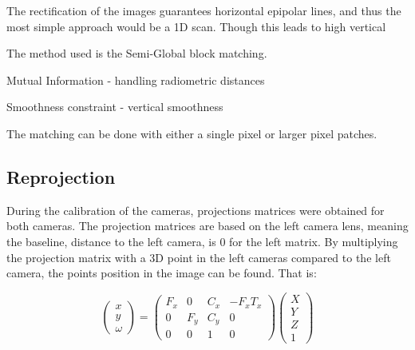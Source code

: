 The rectification of the images guarantees horizontal epipolar lines, and thus the most simple approach would be a 1D scan. Though this leads to high vertical 

The method used is the Semi-Global block matching.




Mutual Information - handling radiometric distances

Smoothness constraint - vertical smoothness





The matching can be done with either a single pixel or larger pixel patches.


\subsection{Reprojection} \label{sec:reprojection}

During the calibration of the cameras, projections matrices were obtained for both cameras. The projection matrices are based on the left camera lens, meaning the baseline, distance to the left camera, is 0 for the left matrix. By multiplying the projection matrix with a 3D point in the left cameras  compared to the left camera, the points position in the image can be found. That is:

\[ 
\begin{pmatrix}
  x \\
  y \\
  \omega 
 \end{pmatrix}	
 = 
 \begin{pmatrix}
  F_{x} & 0 & C_{x} & -F_{x}T_{x} \\
  0 & F_{y} & C_{y} & 0 \\
  0 & 0 & 1 & 0
 \end{pmatrix}
 \begin{pmatrix}
  X \\
  Y \\
  Z \\
  1 
 \end{pmatrix}	
\]

